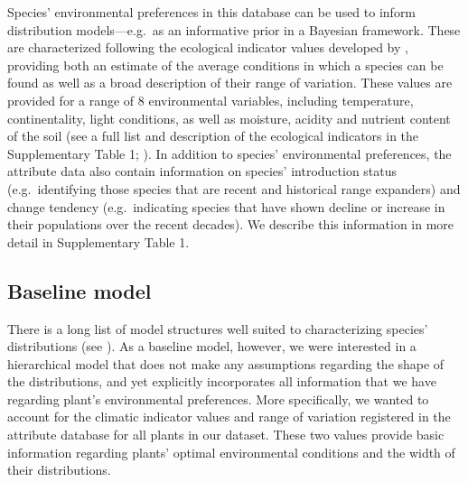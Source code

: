 \documentclass[11pt, a4paper]{article}
\begin{document}
Species' environmental preferences in this database can be used to inform distribution models---e.g.~as an informative prior in a Bayesian framework. These are characterized following the ecological indicator values developed by \citet{landoltFloraIndicativaOkologische2010}, providing both an estimate of the average conditions in which a species can be found as well as a broad description of their range of variation. These values are provided for a range of 8 environmental variables, including temperature, continentality, light conditions, as well as moisture, acidity and nutrient content of the soil (see a full list and description of the ecological indicators in the Supplementary Table 1; \citealt{landoltFloraIndicativaOkologische2010}). In addition to species' environmental preferences, the attribute data also contain information on species' introduction status (e.g.~identifying those species that are recent and historical range expanders) and change tendency (e.g.~indicating species that have shown decline or increase in their populations over the recent decades). We describe this information in more detail in Supplementary Table 1.


\subsection*{Baseline model}
There is a long list of model structures well suited to characterizing species' distributions (see \citealt{norbergComprehensiveEvaluationPredictive2019}). As a baseline model, however, we were interested in a hierarchical model that does not make any assumptions regarding the shape of the distributions, and yet explicitly incorporates all information that we have regarding plant's environmental preferences. More specifically, we wanted to account for the climatic indicator values and range of variation registered in the attribute database for all plants in our dataset. These two values provide basic information regarding plants' optimal environmental conditions and the width of their distributions.
\end{document}
